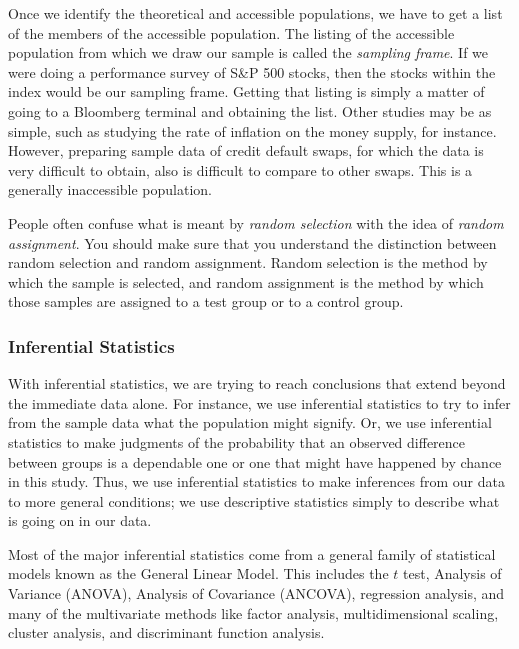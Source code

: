 Once we identify the theoretical and accessible populations, we have to get a list of the members of the accessible population. The listing of the accessible population from which we draw our sample is called the \emph{sampling frame}. If we were doing a performance survey of S\&P 500 stocks, then the stocks within the index would be our sampling frame. Getting that listing is simply a matter of going to a Bloomberg terminal
and obtaining the list. Other studies may be as simple, such as studying the rate of inflation on the money supply, for instance. However, preparing sample data of credit default swaps, for which the data is very difficult to obtain, also is difficult to compare to other swaps. This is a generally inaccessible population.

People often confuse what is meant by \emph{random selection} with the idea of \emph{random assignment}. You should make sure that you understand the distinction between random selection and random assignment. Random selection is the method by which the sample is selected, and random assignment is the method by which those samples are assigned to a test group or to a control group.

\subsubsection{Inferential Statistics}
With inferential statistics, we are trying to reach conclusions that extend beyond the immediate data alone. For instance, we use inferential statistics to try to infer from the sample data what the population might signify. Or, we use inferential statistics to make judgments of the probability that an observed difference between groups is a dependable one or one that might have happened by chance in this study. Thus, we use inferential statistics to make inferences from our data to more general conditions; we use descriptive statistics simply to describe what is going on in our data.
\marginpar{\begin{small}\begin{flushleft}\textcolor{blue}{Inferential statistics help make predictions and judgements}\end{flushleft}\end{small}}

Most of the major inferential statistics come from a general family of statistical models known as the General Linear Model. This includes the $t$ test, Analysis of Variance (ANOVA), Analysis of Covariance (ANCOVA), regression analysis, and many of the multivariate methods like factor analysis, multidimensional scaling, cluster analysis, and discriminant function analysis.

